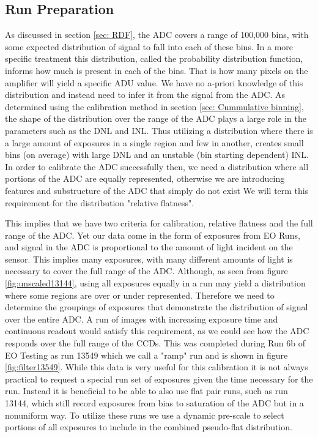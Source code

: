 \documentclass[11pt, letterpaper]{article}
\begin{document}
\subsection{Run Preparation}
\label{sec: Preparation}
\indent


As discussed in section \ref{sec: RDF}, the ADC covers a range of 100,000 bins, with some expected distribution of signal to fall into each of these bins. 
In a more specific treatment this distribution, called the probability distribution function, informs how much is present in each of the bins.
That is how many pixels on the amplifier will yield a specific ADU value.
We have no a-priori knowledge of this distribution and instead need to infer it from the signal from the ADC.
As determined using the calibration method in section \ref{sec: Cummulative binning}, the shape of the distribution over the range of the ADC plays a large role in the parameters such as the DNL and INL.
Thus utilizing a distribution where there is a large amount of exposures in a single region and few in another, creates small bins (on average) with large DNL and an unstable (bin starting dependent) INL. 
In order to calibrate the ADC successfully then, we need a distribution where all portions of the ADC are equally represented, otherwise we are introducing features and substructure of the ADC that simply do not exist
We will term this requirement for the distribution "relative flatness". 
\indent 


This implies that we have two criteria for calibration, relative flatness and the full range of the ADC. 
Yet our data come in the form of exposures from EO Runs, and signal in the ADC is proportional to the amount of light incident on the sensor. 
This implies many exposures, with many different amounts of light is necessary to cover the full range of the ADC. 
Although, as seen from figure \ref{fig:unscaled13144}, using all exposures equally in a run may yield a distribution where some regions are over or under represented. 
Therefore we need to determine the groupings of exposures that demonstrate the distribution of signal over the entire ADC. 
A run of images with increasing exposure time and continuous readout would satisfy this requirement, as we could see how the ADC responds over the full range of the CCDs. 
This was completed during Run 6b of EO Testing as run 13549 which we call a "ramp" run and is shown in figure \ref{fig:filter13549}.
While this data is very useful for this calibration it is not always practical to request a special run set of exposures given the time necessary for the run.
Instead it is beneficial to be able to also use flat pair runs, such as run 13144, which still record exposures from bias to saturation of the ADC but in a nonuniform way.
To utilize these runs we use a dynamic pre-scale to select portions of all exposures to include in the combined pseudo-flat distribution. 
\end{document}
